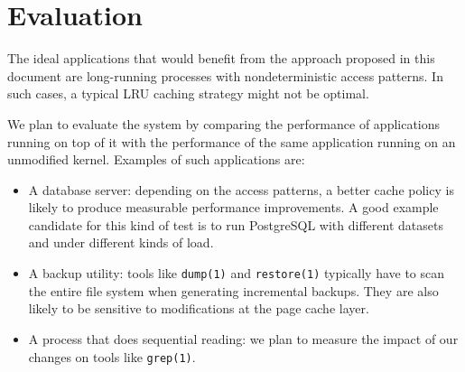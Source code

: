 \section{Evaluation}

The ideal applications that would benefit from the approach proposed in this document
are long-running processes with nondeterministic access patterns. In such cases,
a typical LRU caching strategy might not be optimal.

We plan to evaluate the system by comparing the performance of applications running
on top of it with the performance of the same application running on an unmodified
kernel. Examples of such applications are:

\begin{itemize}
\item A database server: depending on the access patterns, a better cache policy
is likely to produce measurable performance improvements. A good example candidate
for this kind of test is to run PostgreSQL with different datasets and under different
kinds of load.

\item A backup utility: tools like \texttt{dump(1)} and \texttt{restore(1)} typically
have to scan the entire file system when generating incremental backups. They are also
likely to be sensitive to modifications at the page cache layer.

\item A process that does sequential reading: we plan to measure the impact of our
changes on tools like \texttt{grep(1)}.
\end{itemize}
